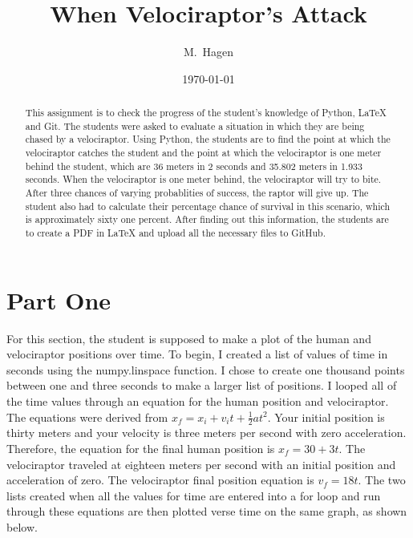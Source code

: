 \documentclass[twocolumn]{revtex4}
\begin{document}
\title{
When Velociraptor's Attack
}

\author{M.~Hagen}

\date{\today}

\begin{abstract}
    This assignment is to check the progress of the student's knowledge of Python, LaTeX and Git. The students were asked to evaluate a situation in which they are being chased by a velociraptor. Using Python, the students are to find the point at which the velociraptor catches the student and the point at which the velociraptor is one meter behind the student, which are 36 meters in 2 seconds and 35.802 meters in 1.933 seconds. When the velociraptor is one meter behind, the velociraptor will try to bite. After three chances of varying probablities of success, the raptor will give up. The student also had to calculate their percentage chance of survival in this scenario, which is approximately sixty one percent. After finding out this information, the students are to create a PDF in LaTeX and upload all the necessary files to GitHub.
\end{abstract}

\maketitle
\section{Part One}
	For this section, the student is supposed to make a plot of the human and velociraptor positions over time. To begin, I created a list of values of time in seconds using the numpy.linspace function. I chose to create one thousand points between one and three seconds to make a larger list of positions. I looped all of the time values through an equation for the human position and velociraptor. The equations were derived from $x_f = x_i + v_it + \frac{1}{2}at^2$. Your initial position is thirty meters and your velocity is three meters per second with zero acceleration. Therefore, the equation for the final human position is $x_f = 30 + 3t$. The velociraptor traveled at eighteen meters per second with an initial position and acceleration of zero. The velociraptor final position equation is $v_f = 18t$. The two lists created when all the values for time are entered into a for loop and run through these equations are then plotted verse time on the same graph, as shown below.  
\end{document}
